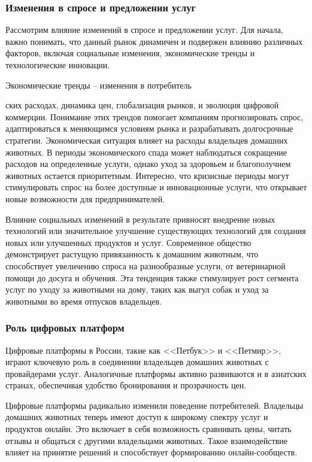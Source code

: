 \subsubsection{Изменения в спросе и предложении услуг}

Рассмотрим влияние изменений в спросе и предложении услуг. Для начала, важно понимать, что данный рынок динамичен и подвержен влиянию различных факторов, включая социальные изменения, экономические тренды и технологические инновации.

Экономические тренды – изменения в потребитель

ских расходах, динамика цен, глобализация рынков, и эволюция цифровой коммерции. Понимание этих трендов помогает компаниям прогнозировать спрос, адаптироваться к меняющимся условиям рынка и разрабатывать долгосрочные стратегии. Экономическая ситуация влияет на расходы владельцев домашних животных. В периоды экономического спада может наблюдаться сокращение расходов на определенные услуги, однако уход за здоровьем и благополучием животных остается приоритетным. Интересно, что кризисные периоды могут стимулировать спрос на более доступные и инновационные услуги, что открывает новые возможности для предпринимателей.

Влияние социальных изменений в результате привносят внедрение новых технологий или значительное улучшение существующих технологий для создания новых или улучшенных продуктов и услуг. Современное общество демонстрирует растущую привязанность к домашним животным, что способствует увеличению спроса на разнообразные услуги, от ветеринарной помощи до досуга и обучения. Эта тенденция также стимулирует рост сегмента услуг по уходу за животными на дому, таких как выгул собак и уход за животными во время отпусков владельцев.

\subsubsection{Роль цифровых платформ}

Цифровые платформы в России, такие как <<Петбук>> и <<Петмир>>, играют ключевую роль в соединении владельцев домашних животных с провайдерами услуг. Аналогичные платформы активно развиваются и в азиатских странах, обеспечивая удобство бронирования и прозрачность цен.

Цифровые платформы радикально изменили поведение потребителей. Владельцы домашних животных теперь имеют доступ к широкому спектру услуг и продуктов онлайн. Это включает в себя возможность сравнивать цены, читать отзывы и общаться с другими владельцами животных. Такое взаимодействие влияет на принятие решений и способствует формированию онлайн-сообществ.


